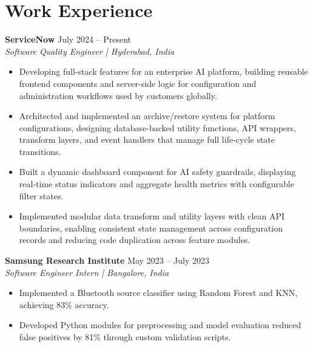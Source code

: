 \documentclass[a4paper,10pt]{article}
\begin{document}
\section*{Work Experience}
\textbf{ServiceNow} \hfill July 2024 -- Present \\
\textit{Software Quality Engineer | Hyderabad, India}
\begin{itemize}[noitemsep,topsep=0pt]
    \item Developing full-stack features for an enterprise AI platform, building reusable frontend components and server-side logic for configuration and administration workflows used by customers globally.
    \item Architected and implemented an archive/restore system for platform configurations, designing database-backed utility functions, API wrappers, transform layers, and event handlers that manage full life-cycle state transitions.
    \item Built a dynamic dashboard component for AI safety guardrails, displaying real-time status indicators and aggregate health metrics with configurable filter states.
    \item Implemented modular data transform and utility layers with clean API boundaries, enabling consistent state management across configuration records and reducing code duplication across feature modules.
\end{itemize}
\textbf{Samsung Research Institute} \hfill May 2023 -- July 2023 \\
\textit{Software Engineer Intern | Bangalore, India}
\begin{itemize}[noitemsep,topsep=0pt]
    \item Implemented a Bluetooth source classifier using Random Forest and KNN, achieving 83\% accuracy.
    \item Developed Python modules for preprocessing and model evaluation reduced false positives by 81\% through custom validation scripts.
\end{itemize}
\end{document}
